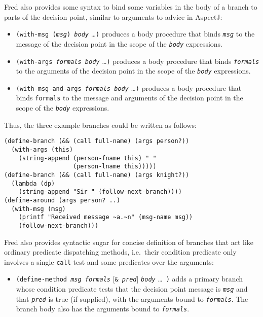 \documentclass{article}
\newcommand{\code}[1]{\texttt{#1}}
\newcommand{\parm}[1]{\code{\textit{#1}}}
\begin{document}
Fred also provides some syntax to bind some variables in the body of a
branch to parts of the decision point, similar to arguments to advice
in AspectJ:

\begin{itemize}
\item \code{(with-msg (\parm{msg}) \parm{body}} \ldots\code{)} produces a body
      procedure that binds \parm{msg} to the message of the decision
      point in the scope of the \parm{body} expressions.
\item \code{(with-args \parm{formals} \parm{body}} \ldots\code{)} produces a
      body procedure that binds \parm{formals} to the arguments of the
      decision point in the scope of the \parm{body} expressions.
\item \code{(with-msg-and-args \parm{formals} \parm{body}}
      \ldots\code{)} produces a body procedure that binds
      \code{formals} to the message and arguments of the decision
      point in the scope of the \parm{body} expressions.
\end{itemize}

Thus, the three example branches could be written as follows:

\begin{verbatim}
(define-branch (&& (call full-name) (args person?))
  (with-args (this)
    (string-append (person-fname this) " "
                   (person-lname this)))))
(define-branch (&& (call full-name) (args knight?))
  (lambda (dp)
    (string-append "Sir " (follow-next-branch))))
(define-around (args person? ..)
  (with-msg (msg)
    (printf "Received message ~a.~n" (msg-name msg))
    (follow-next-branch)))
\end{verbatim}

Fred also provides syntactic sugar for concise definition of
branches that act like ordinary predicate dispatching methods,
i.e.~their condition predicate only involves a single \code{call} test
and some predicates over the arguments:

\begin{itemize}
\item \code{(define-method \parm{msg} \parm{formals}}
            [\code{\& \parm{pred}}] \code{\parm{body}} \ldots\ \code{)}
      adds a primary branch whose condition predicate tests that the
      decision point message is \parm{msg} and that \parm{pred} is
      true (if supplied), with the arguments bound to \parm{formals}.
      The branch body also has the arguments bound to \parm{formals}.
\end{itemize}
\end{document}
